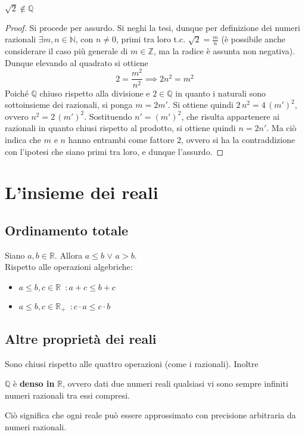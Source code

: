 \documentclass[10pt, oneside]{book}
\theoremstyle{plain}
\begin{document}
\begin{prop}
$\sqrt{2} \notin \mathbb{Q}$
\end{prop}
\begin{proof}
Si procede per assurdo. Si neghi la tesi, dunque per definizione dei numeri razionali $\exists m, n \in \mathbb{N}$, con $n \neq 0$, primi tra loro t.c. $\sqrt{2} = \frac{m}{n}$ (è possibile anche considerare il caso più generale di $m \in \mathbb{Z}$, ma la radice è assunta non negativa). Dunque elevando al quadrato si ottiene
\[2 = \frac{m^2}{n^2} \implies 2n^2 = m^2\]
Poiché $\mathbb{Q}$ chiuso rispetto alla divisione e $2 \in \mathbb{Q}$ in quanto i naturali sono sottoinsieme dei razionali, si ponga $m = 2m'$. Si ottiene quindi $2 \, n^2 = 4 \, (m')^2$, ovvero $n^2 = 2 \, (m')^2$. Sostituendo $n' = (m')^2$, che risulta appartenere ai razionali in quanto chiusi rispetto al prodotto, si ottiene quindi $n = 2 n'$. Ma ciò indica che $m$ e $n$ hanno entrambi come fattore $2$, ovvero si ha la contraddizione con l'ipotesi che siano primi tra loro, e dunque l'assurdo.
\end{proof}

\chapter{L'insieme dei reali}
\section{Ordinamento totale}
\begin{prop}
    Siano $a, b \in \mathbb{R}$. Allora $a \leq b$ $\lor$ $a > b$.
    \\Rispetto alle operazioni algebriche:
    \begin{itemize}[label = $\square$]
        \item $a \leq b, c \in \mathbb{R} \enspace : a + c \leq b + c$
        \item $a \leq b, c \in \mathbb{R}_+ \enspace : c \cdot a \leq c \cdot b$
    \end{itemize}
\end{prop}

\section{Altre proprietà dei reali}
Sono chiusi rispetto alle quattro operazioni (come i razionali). Inoltre 
\begin{prop}
$\mathbb{Q}$ è \textbf{denso in} $\mathbb{R}$, ovvero dati due numeri reali qualsiasi vi sono sempre infiniti numeri razionali tra essi compresi.
\end{prop}
Ciò significa che ogni reale può essere approssimato con precisione arbitraria da numeri razionali.
\end{document}
